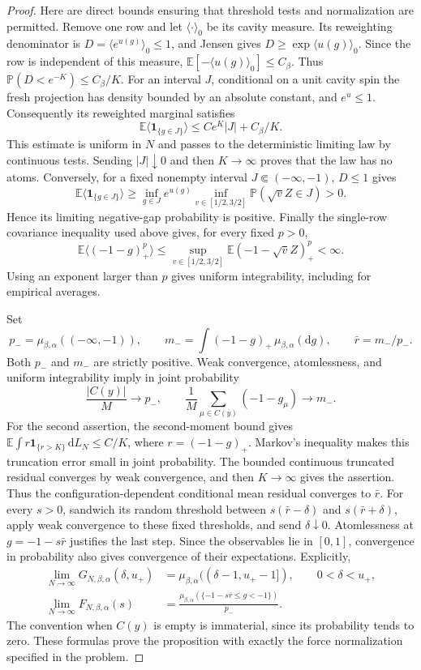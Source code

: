 \documentclass[11pt,a4paper]{article}
\numberwithin{equation}{section}
\theoremstyle{definition}
\theoremstyle{remark}
\newcommand{\E}{\mathbb E}
\newcommand{\Prob}{\mathbb P}
\newcommand{\dd}{\mathrm d}
\newcommand{\ind}{\mathbf 1}
\begin{document}
\begin{proof}
Here are direct bounds ensuring that threshold tests and normalization
are permitted.  Remove one row and let $\langle\cdot\rangle_0$ be its
cavity measure.  Its reweighting denominator is
$D=\langle e^{u(g)}\rangle_0\le1$, and Jensen gives
$D\ge\exp\langle u(g)\rangle_0$.  Since the row is independent of this
measure, $\E[-\langle u(g)\rangle_0]\le C_\beta$.  Thus
$\Prob(D<e^{-K})\le C_\beta/K$.  For an interval $J$, conditional on a
unit cavity spin the fresh projection has density bounded by an absolute
constant, and $e^u\le1$.  Consequently its reweighted marginal satisfies
\[
 \E\langle\ind_{\{g\in J\}}\rangle
 \le C e^K|J|+C_\beta/K.
\]
This estimate is uniform in $N$ and passes to the deterministic limiting
law by continuous tests.  Sending $|J|\downarrow0$ and then $K\to\infty$
proves that the law has no atoms.
Conversely, for a fixed nonempty interval $J\Subset(-\infty,-1)$,
$D\le1$ gives
\[
 \E\langle\ind_{\{g\in J\}}\rangle
 \ge \inf_{g\in J}e^{u(g)}
     \inf_{v\in[1/2,3/2]}\Prob(\sqrt v Z\in J)>0.
\]
Hence its limiting negative-gap probability is positive.
Finally the single-row covariance inequality used above gives, for every
fixed $p>0$,
\[
 \E\langle(-1-g)_+^p\rangle
 \le\sup_{v\in[1/2,3/2]}\E(-1-\sqrt v Z)_+^p<\infty.
\]
Using an exponent larger than $p$ gives uniform integrability, including
for empirical averages.

Set
\[
 p_-=\mu_{\beta,\alpha}(( -\infty,-1)),\qquad
 m_-=\int(-1-g)_+\,\mu_{\beta,\alpha}(\dd g),\qquad
 \bar r=m_-/p_-.
\]
Both $p_-$ and $m_-$ are strictly positive.  Weak convergence,
atomlessness, and uniform integrability imply in joint probability
\[
 \frac{|C(y)|}{M}\longrightarrow p_-,\qquad
 \frac1M\sum_{\mu\in C(y)}(-1-g_\mu)\longrightarrow m_-.
\]
For the second assertion, the second-moment bound gives $\E\int r\ind_{\{r>K\}}\,\dd L_N\le C/K$, where
$r=(-1-g)_+$.  Markov's inequality makes this truncation error small in
joint probability.  The bounded continuous truncated residual converges
by weak convergence, and then $K\to\infty$ gives the assertion.
Thus the configuration-dependent conditional mean residual converges to
$\bar r$.  For every $s>0$, sandwich its random threshold between
$s(\bar r-\delta)$ and $s(\bar r+\delta)$, apply weak convergence to
these fixed thresholds, and send $\delta\downarrow0$.  Atomlessness at
$g=-1-s\bar r$ justifies the last step.  Since the observables lie in
$[0,1]$, convergence in probability also gives convergence of their
expectations.  Explicitly,
\begin{align*}
 \lim_{N\to\infty}G_{N,\beta,\alpha}(\delta,u_+)
 &=\mu_{\beta,\alpha}((\delta-1,u_+-1]),\qquad 0<\delta<u_+,\\
 \lim_{N\to\infty}F_{N,\beta,\alpha}(s)
 &=\frac{\mu_{\beta,\alpha}
       (\{-1-s\bar r\le g<-1\})}{p_-}.
\end{align*}
The convention when $C(y)$ is empty is immaterial, since its probability
tends to zero.  These formulas prove the proposition with exactly the
force normalization specified in the problem.
\end{proof}
\end{document}
